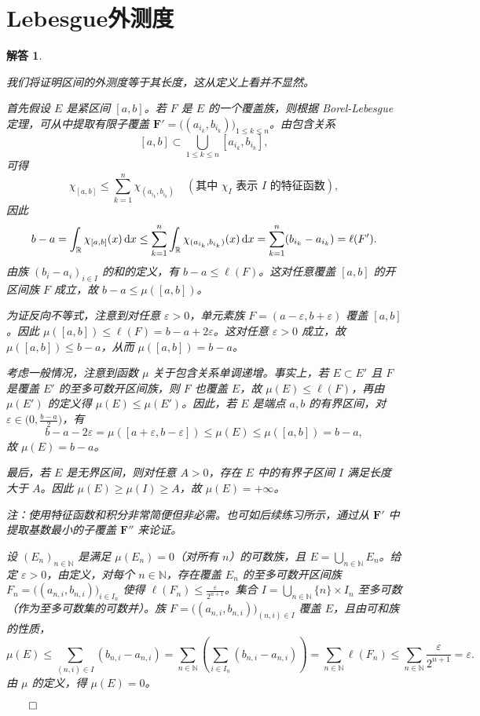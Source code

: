 \documentclass[12pt,UTF8]{ctexbook}
\theoremstyle{exercisestyle}
\theoremstyle{solutionstyle}
\newtheorem*{solution*}{解答}
\newenvironment{solution}
  {\begin{solution*}}
  {\hfill\ensuremath{\qed}\end{solution*}}
\begin{document}
\section{Lebesgue外测度}
\begin{solution}
\begin{subquestions}
\item 我们将证明区间的外测度等于其长度，这从定义上看并不显然。

首先假设 \(E\) 是紧区间 \([a, b]\)。若 \(F\) 是 \(E\) 的一个覆盖族，则根据 Borel-Lebesgue 定理，可从中提取有限子覆盖 \(\mathbf{F}' = \bigl((a_{i_k}, b_{i_k})\bigr)_{1 \leq k \leq n}\)。由包含关系
\[
[a, b] \subset \bigcup_{1 \leq k \leq n} [a_{i_k}, b_{i_k}],
\]
可得
\[
\chi_{[a,b]} \leq \sum_{k=1}^{n} \chi_{(a_{i_k}, b_{i_k})} \quad (\text{其中 } \chi_{I} \text{ 表示 } I \text{ 的特征函数}),
\]
因此
\[
b - a = \int_{\mathbb{R}} \chi_{[a,b]}(x) \,\mathrm{d}x \leq \sum_{k=1}^{n} \int_{\mathbb{R}} \chi_{(a_{i_k}, b_{i_k})}(x) \,\mathrm{d}x = \sum_{k=1}^{n} (b_{i_k} - a_{i_k}) = \ell(F').
\]
由族 \((b_i - a_i)_{i \in I}\) 的和的定义，有 \(b - a \leq \ell(F)\)。这对任意覆盖 \([a, b]\) 的开区间族 \(F\) 成立，故 \(b - a \leq \mu([a, b])\)。

为证反向不等式，注意到对任意 \(\varepsilon > 0\)，单元素族 \(F = (a - \varepsilon, b + \varepsilon)\) 覆盖 \([a, b]\)。因此 \(\mu([a, b]) \leq \ell(F) = b - a + 2\varepsilon\)。这对任意 \(\varepsilon > 0\) 成立，故 \(\mu([a, b]) \leq b - a\)，从而 \(\mu([a, b]) = b - a\)。

考虑一般情况，注意到函数 \(\mu\) 关于包含关系单调递增。事实上，若 \(E \subset E'\) 且 \(F\) 是覆盖 \(E'\) 的至多可数开区间族，则 \(F\) 也覆盖 \(E\)，故 \(\mu(E) \leq \ell(F)\)，再由 \(\mu(E')\) 的定义得 \(\mu(E) \leq \mu(E')\)。因此，若 \(E\) 是端点 \(a, b\) 的有界区间，对 \(\varepsilon \in \bigl(0, \frac{b-a}{2}\bigr)\)，有
\[
b - a - 2\varepsilon = \mu([a + \varepsilon, b - \varepsilon]) \leq \mu(E) \leq \mu([a, b]) = b - a,
\]
故 \(\mu(E) = b - a\)。

最后，若 \(E\) 是无界区间，则对任意 \(A > 0\)，存在 \(E\) 中的有界子区间 \(I\) 满足长度大于 \(A\)。因此 \(\mu(E) \geq \mu(I) \geq A\)，故 \(\mu(E) = +\infty\)。

注：使用特征函数和积分非常简便但非必需。也可如后续练习所示，通过从 \(\mathbf{F}'\) 中提取基数最小的子覆盖 \(\mathbf{F}''\) 来论证。

\item 设 \((E_n)_{n \in \mathbb{N}}\) 是满足 \(\mu(E_n) = 0\)（对所有 \(n\)）的可数族，且 \(E = \bigcup_{n \in \mathbb{N}} E_n\)。给定 \(\varepsilon > 0\)，由定义，对每个 \(n \in \mathbb{N}\)，存在覆盖 \(E_n\) 的至多可数开区间族 \(F_n = \bigl((a_{n,i}, b_{n,i})\bigr)_{i \in I_n}\) 使得 \(\ell(F_n) \leq \frac{\varepsilon}{2^{n+1}}\)。集合 \(I = \bigcup_{n \in \mathbb{N}} \{n\} \times I_n\) 至多可数（作为至多可数集的可数并）。族 \(F = \bigl((a_{n,i}, b_{n,i})\bigr)_{(n,i) \in I}\) 覆盖 \(E\)，且由可和族的性质，
\[
\mu(E) \leqslant \sum_{(n,i) \in I} (b_{n,i} - a_{n,i}) = \sum_{n \in \mathbb{N}} \left( \sum_{i \in I_n} (b_{n,i} - a_{n,i}) \right) = \sum_{n \in \mathbb{N}} \ell(F_n) \leqslant \sum_{n \in \mathbb{N}} \frac{\varepsilon}{2^{n+1}} = \varepsilon.
\]
由 \(\mu\) 的定义，得 \(\mu(E) = 0\)。


\end{subquestions}
\end{solution}
\end{document}
